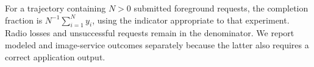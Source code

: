 For a trajectory containing $N>0$ submitted foreground requests, the completion fraction is $N^{-1}\sum_{i=1}^{N}y_i$, using the indicator appropriate to that experiment. Radio losses and unsuccessful requests remain in the denominator. We report modeled and image-service outcomes separately because the latter also requires a correct application output.

